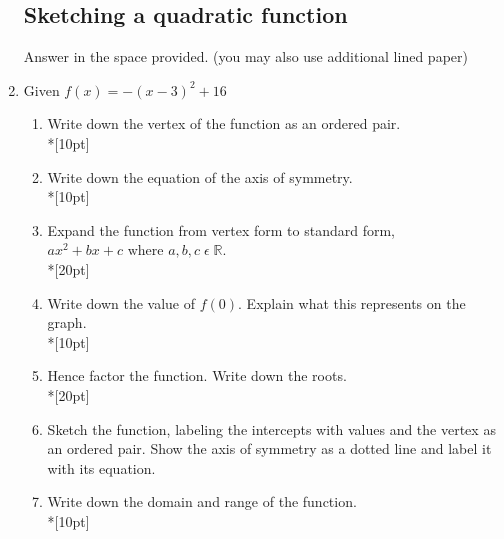 \documentclass[12pt, twoside]{article}
\begin{document}
\begin{enumerate}
    \subsection*{Sketching a quadratic function}
    Answer in the space provided. (you may also use additional lined paper)
    \item   Given $f(x)=-(x-3)^2+16$
    \begin{enumerate}
        \item Write down the vertex of the function as an ordered pair.\\*[10pt]
        \item Write down the equation of the axis of symmetry.\\*[10pt]
        \item Expand the function from vertex form to standard form, $ax^2+bx+c \text{ where } a, b, c \;  \epsilon \; \mathbb{R}$.\\*[20pt]
        \item Write down the value of $f(0)$. Explain what this represents on the graph.\\*[10pt]
        \item Hence factor the function. Write down the roots.\\*[20pt]
        \item Sketch the function, labeling the intercepts with values and the vertex as an ordered pair. Show the axis of symmetry as a dotted line and label it with its equation.
        \begin{flushright}
          \end{flushright}
    
        \item Write down the domain and range of the function.\\*[10pt]
    \end{enumerate}
    
    
    \newpage

\end{enumerate}
\end{document}
